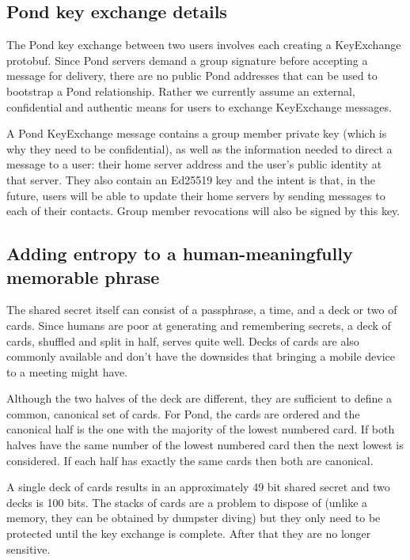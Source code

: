 \documentclass[letterpaper,twocolumn,10pt]{article}
\begin{document}
\subsection{Pond key exchange details}

The Pond key exchange between two users involves each creating a KeyExchange
protobuf\cite{pondprotobufs}. Since Pond servers demand a group signature
before accepting a message for delivery, there are no public Pond addresses
that can be used to bootstrap a Pond relationship.  Rather we currently assume
an external, confidential and authentic means for users to exchange KeyExchange
messages.

A Pond KeyExchange message contains a group member private key (which is why
they need to be confidential), as well as the information needed to direct a
message to a user: their home server address and the user's public identity at
that server.  They also contain an Ed25519 key and the intent is that, in the
future, users will be able to update their home servers by sending messages to
each of their contacts. Group member revocations will also be signed by this
key.

\subsection{Adding entropy to a human-meaningfully memorable phrase}

The shared secret itself can consist of a passphrase, a time, and a deck or two
of cards. Since humans are poor at generating and remembering secrets, a deck
of cards, shuffled and split in half, serves quite well. Decks of cards are also
commonly available and don't have the downsides that bringing a mobile device
to a meeting might have.

Although the two halves of the deck are different, they are sufficient to
define a common, canonical set of cards. For Pond, the cards are ordered and
the canonical half is the one with the majority of the lowest numbered card. If
both halves have the same number of the lowest numbered card then the next
lowest is considered. If each half has exactly the same cards then both are
canonical.

A single deck of cards results in an approximately 49 bit shared secret and two
decks is 100 bits. The stacks of cards are a problem to dispose of (unlike a
memory, they can be obtained by dumpster diving) but they only need to be
protected until the key exchange is complete. After that they are no longer
sensitive.
\end{document}
